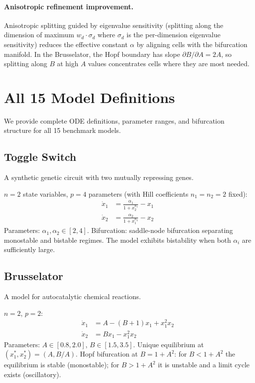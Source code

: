 \documentclass[11pt]{article}
\begin{document}
\paragraph{Anisotropic refinement improvement.}
Anisotropic splitting guided by eigenvalue sensitivity (splitting along the dimension of maximum $w_d \cdot \sigma_d$ where $\sigma_d$ is the per-dimension eigenvalue sensitivity) reduces the effective constant $\alpha$ by aligning cells with the bifurcation manifold.
In the Brusselator, the Hopf boundary has slope $\partial B / \partial A = 2A$, so splitting along $B$ at high $A$ values concentrates cells where they are most needed.

\section{All 15 Model Definitions}
\label{app:models}

We provide complete ODE definitions, parameter ranges, and bifurcation structure for all 15 benchmark models.

\subsection{Toggle Switch~\cite{gardner2000toggle}}

A synthetic genetic circuit with two mutually repressing genes.

$n=2$ state variables, $p=4$ parameters (with Hill coefficients $n_1 = n_2 = 2$ fixed):
\begin{align*}
\dot{x}_1 &= \frac{\alpha_1}{1 + x_2^{n_1}} - x_1 \\
\dot{x}_2 &= \frac{\alpha_2}{1 + x_1^{n_2}} - x_2
\end{align*}
Parameters: $\alpha_1, \alpha_2 \in [2, 4]$.
Bifurcation: saddle-node bifurcation separating monostable and bistable regimes.
The model exhibits bistability when both $\alpha_i$ are sufficiently large.

\subsection{Brusselator}

A model for autocatalytic chemical reactions.

$n=2$, $p=2$:
\begin{align*}
\dot{x}_1 &= A - (B+1)x_1 + x_1^2 x_2 \\
\dot{x}_2 &= Bx_1 - x_1^2 x_2
\end{align*}
Parameters: $A \in [0.8, 2.0]$, $B \in [1.5, 3.5]$.
Unique equilibrium at $(x_1^*, x_2^*) = (A, B/A)$.
Hopf bifurcation at $B = 1 + A^2$: for $B < 1 + A^2$ the equilibrium is stable (monostable); for $B > 1 + A^2$ it is unstable and a limit cycle exists (oscillatory).
\end{document}
